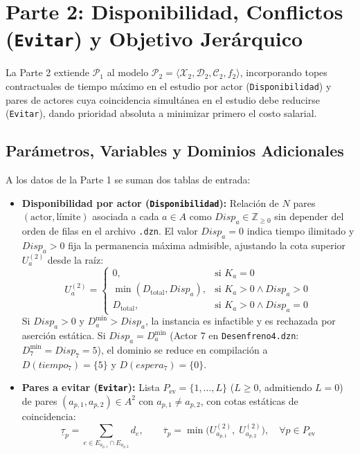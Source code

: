 \section{Parte 2: Disponibilidad, Conflictos (\texttt{Evitar}) y Objetivo Jerárquico}
\label{sec:modelo_parte2}

La Parte 2 extiende $\mathcal{P}_1$ al modelo $\mathcal{P}_2 = \langle \mathcal{X}_2, \mathcal{D}_2, \mathcal{C}_2, f_2 \rangle$, incorporando topes contractuales de tiempo máximo en el estudio por actor (\texttt{Disponibilidad}) y pares de actores cuya coincidencia simultánea en el estudio debe reducirse (\texttt{Evitar}), dando prioridad absoluta a minimizar primero el costo salarial.

\subsection{Parámetros, Variables y Dominios Adicionales}

A los datos de la Parte 1 se suman dos tablas de entrada:
\begin{itemize}
    \item \textbf{Disponibilidad por actor (\texttt{Disponibilidad}):} Relación de $N$ pares $(\text{actor}, \text{límite})$ asociada a cada $a \in A$ como $Disp_a \in \mathbb{Z}_{\ge 0}$ sin depender del orden de filas en el archivo \texttt{.dzn}. El valor $Disp_a = 0$ indica tiempo ilimitado y $Disp_a > 0$ fija la permanencia máxima admisible, ajustando la cota superior $U^{(2)}_a$ desde la raíz:
    \begin{equation}
        U^{(2)}_a = \begin{cases}
            0, & \text{si } K_a = 0 \\
            \min(D_{\text{total}}, Disp_a), & \text{si } K_a > 0 \land Disp_a > 0 \\
            D_{\text{total}}, & \text{si } K_a > 0 \land Disp_a = 0
        \end{cases}
        \label{eq:u2_actor}
    \end{equation}
    Si $Disp_a > 0$ y $D^{\min}_a > Disp_a$, la instancia es infactible y es rechazada por aserción estática. Si $Disp_a = D^{\min}_a$ (Actor 7 en \texttt{Desenfreno4.dzn}: $D^{\min}_7 = Disp_7 = 5$), el dominio se reduce en compilación a $D(tiempo_7) = \{5\}$ y $D(espera_7) = \{0\}$.
    \item \textbf{Pares a evitar (\texttt{Evitar}):} Lista $P_{\text{ev}} = \{1, \dots, L\}$ ($L \ge 0$, admitiendo $L = 0$) de pares $(a_{p,1}, a_{p,2}) \in A^2$ con $a_{p,1} \neq a_{p,2}$, con cotas estáticas de coincidencia:
    \begin{equation}
        \underline{\tau}_p = \sum_{e \in E_{a_{p,1}} \cap E_{a_{p,2}}} d_e, \qquad
        \overline{\tau}_p = \min\big(U^{(2)}_{a_{p,1}},\; U^{(2)}_{a_{p,2}}\big), \quad \forall p \in P_{\text{ev}}
        \label{eq:cotas_solape}
    \end{equation}
\end{itemize}

